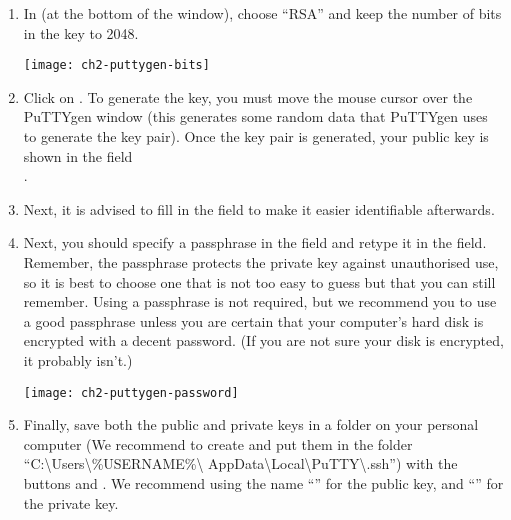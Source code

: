   \begin{enumerate}
    \item  In  (at the bottom of the window), choose
      ``RSA'' and keep the number of bits in the key to 2048.

    \begin{center}
    \texttt{[image: ch2-puttygen-bits]}
    \end{center}

    \item  Click on . To generate the key, you must move
      the mouse cursor over the PuTTYgen window (this generates some random
      data that PuTTYgen uses to generate the key pair). Once the key pair is
      generated, your public key is shown in the field \\
      .
    \item  Next, it is advised to fill in the  field
      to make it easier identifiable afterwards.
    \item  Next, you should specify a passphrase in the 
      field and retype it in the  field.
      Remember, the passphrase protects the private key against unauthorised
      use, so it is best to choose one that is not too easy to guess but that
      you can still remember.
      Using a passphrase is not required, but we recommend you to use a good
      passphrase unless you are certain that your computer's hard disk is
      encrypted with a decent password. (If you are not sure your disk is
      encrypted, it probably isn't.)

    \begin{center}
    \texttt{[image: ch2-puttygen-password]}
    \end{center}

    \item  Finally, save both the public and private keys in a folder on your
      personal computer (We recommend to create and put them in the folder
      ``C:\textbackslash Users\textbackslash \%USERNAME\%\textbackslash
      AppData\textbackslash Local\textbackslash PuTTY\textbackslash .ssh'')
      with the buttons  and .
      We recommend using the name ``'' for the public key,
      and ``'' for the private key.
  \end{enumerate}

